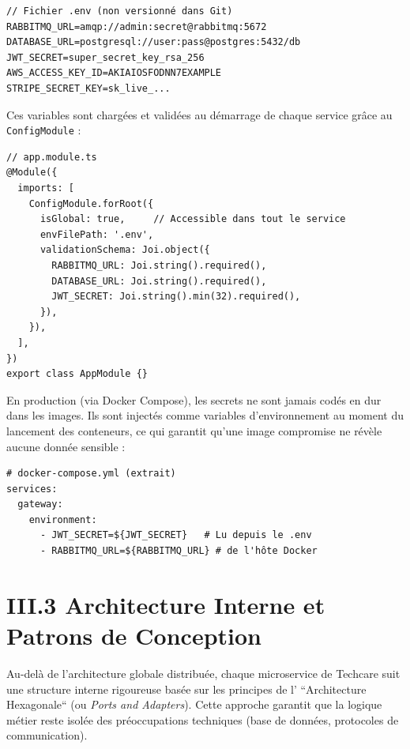 \begin{verbatim}
// Fichier .env (non versionné dans Git)
RABBITMQ_URL=amqp://admin:secret@rabbitmq:5672
DATABASE_URL=postgresql://user:pass@postgres:5432/db
JWT_SECRET=super_secret_key_rsa_256
AWS_ACCESS_KEY_ID=AKIAIOSFODNN7EXAMPLE
STRIPE_SECRET_KEY=sk_live_...
\end{verbatim}

Ces variables sont charg\'ees et valid\'ees au d\'emarrage de chaque service gr\^ace au \texttt{ConfigModule} :

\begin{verbatim}
// app.module.ts
@Module({
  imports: [
    ConfigModule.forRoot({
      isGlobal: true,     // Accessible dans tout le service
      envFilePath: '.env',
      validationSchema: Joi.object({
        RABBITMQ_URL: Joi.string().required(),
        DATABASE_URL: Joi.string().required(),
        JWT_SECRET: Joi.string().min(32).required(),
      }),
    }),
  ],
})
export class AppModule {}
\end{verbatim}

En production (via Docker Compose), les secrets ne sont jamais cod\'es en dur dans les images. Ils sont inject\'es comme variables d'environnement au moment du lancement des conteneurs, ce qui garantit qu'une image compromise ne r\'ev\`ele aucune donn\'ee sensible :

\begin{verbatim}
# docker-compose.yml (extrait)
services:
  gateway:
    environment:
      - JWT_SECRET=${JWT_SECRET}   # Lu depuis le .env
      - RABBITMQ_URL=${RABBITMQ_URL} # de l'hôte Docker
\end{verbatim}


\section{III.3 Architecture Interne et Patrons de Conception}
\label{sec:internal_arch}

Au-delà de l'architecture globale distribuée, chaque microservice de Techcare suit une structure interne rigoureuse basée sur les principes de l' ``Architecture Hexagonale`` (ou \textit{Ports and Adapters}). Cette approche garantit que la logique métier reste isolée des préoccupations techniques (base de données, protocoles de communication).


